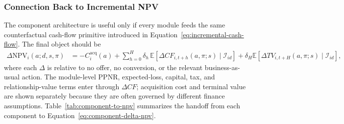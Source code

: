 \documentclass[11pt]{article}
\newcommand{\E}{\mathbb{E}}
\newcommand{\NPV}{\mathrm{NPV}}
\newcommand{\1}{\mathbf{1}}
\begin{document}
\subsubsection{Connection Back to Incremental NPV}
\label{subsec:component-to-npv}

The component architecture is useful only if every module feeds the same
counterfactual cash-flow primitive introduced in
Equation~\eqref{eq:incremental-cash-flow}. The final object should be
\begin{align}
  \Delta \NPV_i(a;d,s,\pi)
  &=
  - C_i^{\mathrm{acq}}(a)
  +
  \sum_{h=0}^{H}
  \delta_h\,
  \E\!\left[
    \Delta CF_{i,t+h}(a,\pi;s)
    \mid \mathcal{I}_{id}
  \right]
  +
  \delta_H
  \E\!\left[
    \Delta TV_{i,t+H}(a,\pi;s)
    \mid \mathcal{I}_{id}
  \right],
  \label{eq:component-delta-npv}
\end{align}
where each $\Delta$ is relative to no offer, no conversion, or the relevant
business-as-usual action. The module-level PPNR, expected-loss, capital, tax,
and relationship-value terms enter through $\Delta CF$; acquisition cost and
terminal value are shown separately because they are often governed by
different finance assumptions. Table~\ref{tab:component-to-npv} summarizes the
handoff from each component to Equation~\eqref{eq:component-delta-npv}.
\end{document}
